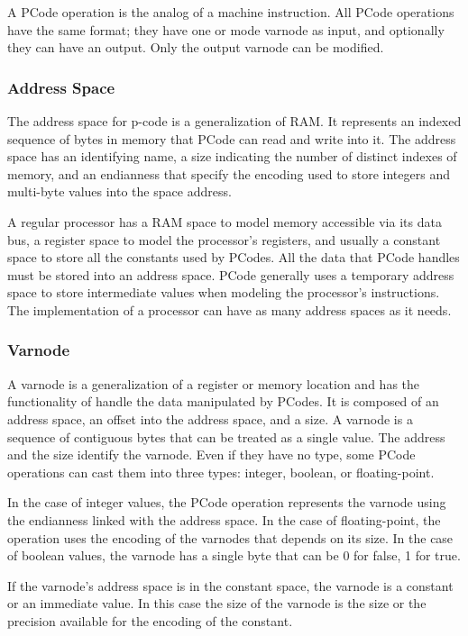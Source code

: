 A PCode operation is the analog of a machine instruction.  All PCode operations have the same format; they have one or mode varnode as input, and optionally they can have an output. Only the output varnode can be modified. 

\subsubsection{Address Space}

The address space for p-code is a generalization of RAM. It represents an indexed sequence of bytes in memory that PCode can read and write into it. The address space has an identifying name, a size indicating the number of distinct indexes of memory, and an endianness that specify the encoding used to store integers and multi-byte values into the space address.

A regular processor has a RAM space to model memory accessible via its data bus, a register space to model the processor's registers, and usually a constant space to store all the constants used by PCodes. All the data that PCode handles must be stored into an address space. 
PCode generally uses a temporary address space to store intermediate values when modeling the processor's instructions. 
The implementation of a processor can have as many address spaces as it needs.


\subsubsection{Varnode}
A varnode is a generalization of a register or memory location and has the functionality of handle the data manipulated by PCodes. It is composed of an address space, an offset into the address space, and a size. 
A varnode is a sequence of contiguous bytes that can be treated as a single value. The address and the size identify the varnode. Even if they have no type, some PCode operations can cast them into three types: integer, boolean, or floating-point. 

In the case of integer values, the PCode operation represents the varnode using the endianness linked with the address space.
In the case of floating-point, the operation uses the encoding of the varnodes that depends on its size.
In the case of boolean values, the varnode has a single byte that can be 0 for false, 1 for true.

If the varnode's address space is in the constant space, the varnode is a constant or an immediate value. In this case the size of the varnode is the size or the precision available for the encoding of the constant.



